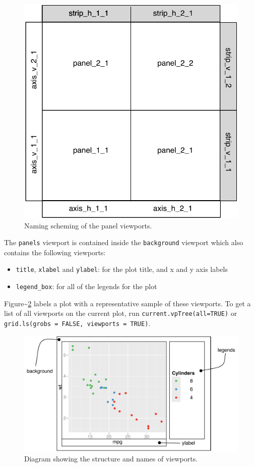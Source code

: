 \begin{figure}[htbp]
  \centering
    \includegraphics[width=0.5 \linewidth]{diagrams/grid-panelvp}
  \caption{Naming scheming of the panel viewports.}
  \label{fig:panelvp}
\end{figure}

The \texttt{panels} viewport is contained inside the \texttt{background}
viewport which also contains the following viewports:

\begin{itemize}
\itemsep1pt\parskip0pt
\item
  \texttt{title}, \texttt{xlabel} and \texttt{ylabel}: for the plot
  title, and x and y axis labels
\item
  \texttt{legend\_box}: for all of the legends for the plot
\end{itemize}

\noindent Figure\textasciitilde{}\ref{fig:viewports} labels a plot with
a representative sample of these viewports. To get a list of all
viewports on the current plot, run \texttt{current.vpTree(all=TRUE)} or
\texttt{grid.ls(grobs = FALSE, viewports = TRUE)}.

\begin{figure}[htbp]
  \centering
    \includegraphics[width=\linewidth]{diagrams/grid-viewports}
  \caption{Diagram showing the structure and names of viewports.}
  \label{fig:viewports}
\end{figure}

